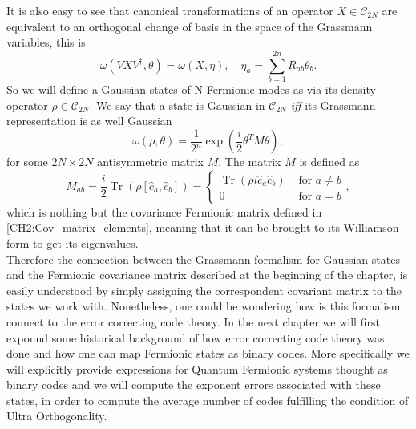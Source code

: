 \indent It is also easy to see that canonical transformations of an operator $X\in\mathcal{C}_{2N}$ are equivalent to an orthogonal change of basis in the space of the Grassmann variables, this is
\begin{equation}
\omega\left(V X V^{\dagger}, \theta\right)=\omega(X, \eta), \quad \eta_{a}=\sum_{b=1}^{2 n} R_{a b} \theta_{b}.
\label{CH2:Transformations_in_Grassmann_Variables}
\end{equation}
\indent So we will define  a Gaussian states of N Fermionic modes as via its density operator $\rho\in\mathcal{C}_{2N}$. We say that a state is Gaussian in  $\mathcal{C}_{2N}$ \textit{iff} its Grassmann representation is as well Gaussian
\begin{equation}
\omega(\rho, \theta)=\frac{1}{2^{n}} \exp \left(\frac{i}{2} \theta^{T} M \theta\right),
\end{equation}
for some $2N\times 2N$ antisymmetric matrix $M$. The matrix $M$ is defined as 
\begin{equation}
M_{a b}=\frac{i}{2} \operatorname{Tr}\left(\rho\left[\hat{c}_{a}, \hat{c}_{b}\right]\right)=\left\{\begin{aligned}
\operatorname{Tr}\left(\rho i \hat{c}_{a} \hat{c}_{b}\right) & \text { for } a \neq b \\
0 & \text { for } a=b
\end{aligned}\right. ,
\end{equation}
which is nothing but the covariance Fermionic matrix defined in \eqref{CH2:Cov_matrix_elements}, meaning that it can be brought to its Williamson form to get its eigenvalues.\\
\indent Therefore the connection between the Grassmann formalism for Gaussian states and the Fermionic covariance matrix described at the beginning of the chapter, is easily understood by simply assigning the correspondent covariant matrix to the states we work with. Nonetheless, one could be wondering how is this formalism connect to the error correcting code theory. In the next chapter we will first expound some historical background of how error correcting code theory was done and how one can map Fermionic states as binary codes. More specifically we will explicitly provide expressions for Quantum Fermionic systems thought as binary codes and we will compute the exponent errors associated with these states, in order to compute the average number of codes fulfilling the condition of Ultra Orthogonality.

